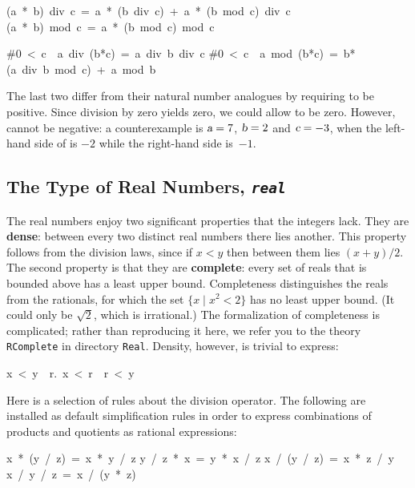 \begin{isabelle}
(a\ *\ b)\ div\ c\ =\ a\ *\ (b\ div\ c)\ +\ a\ *\ (b\ mod\ c)\ div\ c%
\isanewline
(a\ *\ b)\ mod\ c\ =\ a\ *\ (b\ mod\ c)\ mod\ c%
\end{isabelle}

\begin{isabelle}
\#0\ <\ c\ \isasymLongrightarrow \ a\ div\ (b*c)\ =\ a\ div\ b\ div\ c%
\isanewline
\#0\ <\ c\ \isasymLongrightarrow \ a\ mod\ (b*c)\ =\ b*(a\ div\ b\ mod\
c)\ +\ a\ mod\ b%
\end{isabelle}
The last two differ from their natural number analogues by requiring
 to be positive.  Since division by zero yields zero, we could allow
\isa{c} to be zero.  However, \isa{c} cannot be negative: a counterexample
is
$\emph{\sl a} = 7$, $\emph{\sl b} = 2$ and $\emph{\sl c} = -3$, when the left-hand side of
\isa{zdiv_zmult2_eq} is $-2$ while the right-hand side is~$-1$.


\subsection{The Type of Real Numbers, {\tt\slshape real}}

The real numbers enjoy two significant properties that the integers lack. 
They are
\textbf{dense}: between every two distinct real numbers there lies another.
This property follows from the division laws, since if $x<y$ then between
them lies $(x+y)/2$.  The second property is that they are
\textbf{complete}: every set of reals that is bounded above has a least
upper bound.  Completeness distinguishes the reals from the rationals, for
which the set $\{x\mid x^2<2\}$ has no least upper bound.  (It could only be
$\surd2$, which is irrational.)
The formalization of completeness is complicated; rather than
reproducing it here, we refer you to the theory \texttt{RComplete} in
directory \texttt{Real}.
Density, however, is trivial to express:
\begin{isabelle}
x\ <\ y\ \isasymLongrightarrow \ \isasymexists r.\ x\ <\ r\ \isasymand \ r\ <\ y%
\rulename{real_dense}
\end{isabelle}

Here is a selection of rules about the division operator.  The following
are installed as default simplification rules in order to express
combinations of products and quotients as rational expressions:
\begin{isabelle}
x\ *\ (y\ /\ z)\ =\ x\ *\ y\ /\ z
\isanewline
y\ /\ z\ *\ x\ =\ y\ *\ x\ /\ z
\isanewline
x\ /\ (y\ /\ z)\ =\ x\ *\ z\ /\ y
\isanewline
x\ /\ y\ /\ z\ =\ x\ /\ (y\ *\ z)
\end{isabelle}

